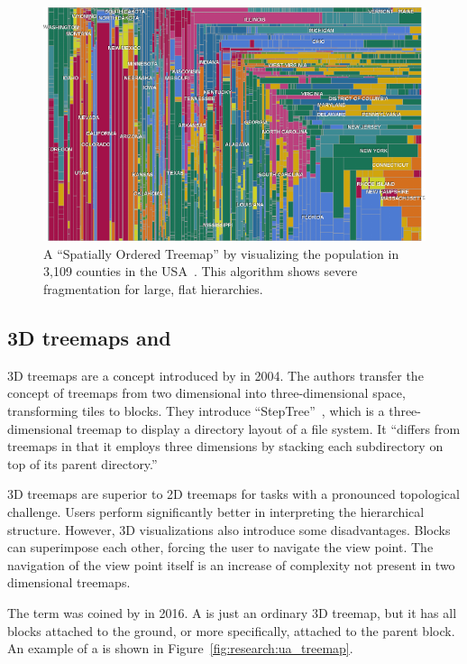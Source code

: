 \begin{figure}
  \centering
  \includegraphics[width=\textwidth]{figures/related-work/spatiallyOrderedTreemap}
  \caption{
    A ``Spatially Ordered Treemap'' by \textcite{Wood2008} visualizing the population in 3,109 counties in the USA~\parencite{Ghoniem2015}.
    This algorithm shows severe fragmentation for large, flat hierarchies.
  }\label{fig:related-work:spatially-ordered-treemap}
\end{figure}


\subsection{3D treemaps and \tmaps{}}
3D treemaps are a concept introduced by \textcite{Bladh2004} in 2004.
The authors transfer the concept of treemaps from two dimensional into three-dimensional space, transforming tiles to blocks.
They introduce ``StepTree''~\parencite{Bladh2004}, which is a three-dimensional treemap to display a directory layout of a file system.
It ``differs from treemaps in that it employs three dimensions by stacking each subdirectory on top of its parent directory.''

3D treemaps are superior to 2D treemaps for tasks with a pronounced topological challenge.
Users perform significantly better in interpreting the hierarchical structure.
However, 3D visualizations also introduce some disadvantages.
Blocks can superimpose each other, forcing the user to navigate the view point.
The navigation of the view point itself is an increase of complexity not present in two dimensional treemaps.

The term \tmap{} was coined by \textcite{Limberger2016} in 2016.
A \tmap{} is just an ordinary 3D treemap, but it has all blocks attached to the ground, or more specifically, attached to the parent block.
An example of a \tmap{} is shown in Figure~\ref{fig:research:ua_treemap}.

